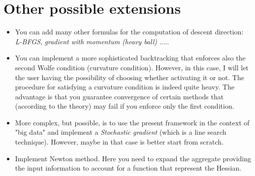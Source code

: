 \documentclass{article}
\begin{document}
\section{Other possible extensions}
\begin{itemize}
    \item You can add many other formulas for the computation of descent direction: \emph{L-BFGS}, \emph{gradient with momentum (heavy ball)} ..... 
    \item You can implement a more sophisticated backtracking that enforces also the second Wolfe condition (curvature condition). However, in this case, I will let the user having the possibility of choosing whether activating it or not. The procedure for satisfying a curvature condition is indeed
    quite heavy. The advantage is that you guarantee convergence of certain methods that (according to the theory) may fail if you enforce only the first condition.
    \item More complex, but possible, is to use the present framework in the context of "big data" and implement a \emph{Stochastic gradient} (which is a line search technique). However, maybe in that case is better start from scratch. 
    \item Implement Newton method. Here you need to expand the aggregate providing the input information to account for a function that represent the Hessian. 
\end{itemize}

 

  
\end{document}
